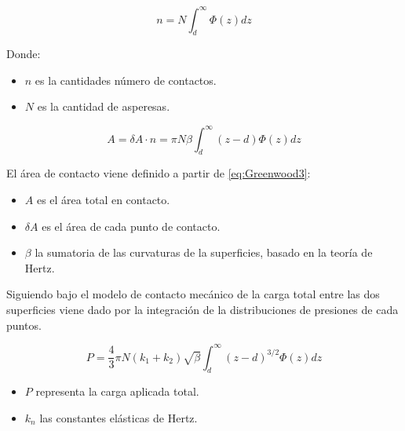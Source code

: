 \documentclass[main]{subfiles}
\begin{document}
\begin{equation}
\label{eq:Greenwood2}
n=N \int_d^\infty \Phi(z) dz
\end{equation}

\par \hspace{1cm}
\begin{minipage}{10cm}
\begin{spacing}{0.5}
Donde:
\begin{itemize}
\item $n$ es la cantidades número de contactos.
\item $N$ es la cantidad de asperesas.
\end{itemize}
\end{spacing}
\end{minipage}

\begin{equation}
\label{eq:Greenwood3}
A=\delta A \cdot n=\pi N \beta \int_d^\infty (z-d)\Phi(z) dz
\end{equation}

El área de contacto viene definido a partir de \ref{eq:Greenwood3}:

\par \hspace{1cm}
\begin{minipage}{10cm}
\begin{spacing}{0.5}
\begin{itemize}
\item $A$ es el área total en contacto.
\item $\delta A$ es el área de cada punto de contacto.
\item $\beta$ la sumatoria de las curvaturas de la superficies, basado en la teoría de Hertz.
\end{itemize}
\end{spacing}
\end{minipage}

Siguiendo bajo el modelo de contacto mecánico de \citet{Herz1881} la carga total entre las dos superficies viene dado por la integración de la distribuciones de presiones de cada puntos.

\begin{equation}
\label{eq:Greenwood4}
P=\frac{4}{3}\pi N (k_1+k_2) \sqrt{\beta} \int_d^\infty (z-d)^{3/2}\Phi(z) dz
\end{equation}

\par \hspace{1cm}
\begin{minipage}{10cm}
\begin{spacing}{0.5}
\begin{itemize}
\item $P$ representa la carga aplicada total.
\item $k_n$ las constantes elásticas de Hertz.
\end{itemize}
\end{spacing}
\end{minipage}
\end{document}
